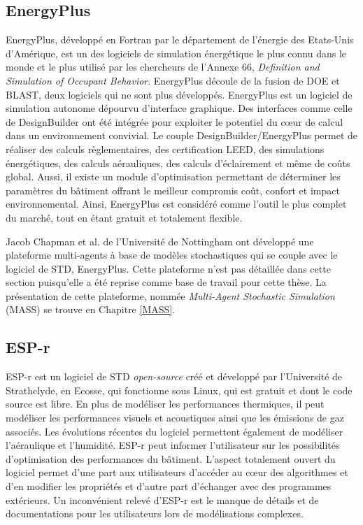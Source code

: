 \subsection*{EnergyPlus}

EnergyPlus, développé en Fortran par le département de l'énergie des Etats-Unis d'Amérique, est un des logiciels de simulation énergétique le plus connu dans le monde \cite{Sousa-13} et le plus utilisé par les chercheurs de l'Annexe 66, \textit{Definition and Simulation of Occupant Behavior}. EnergyPlus découle de la fusion de DOE et BLAST, deux logiciels qui ne sont plus développés. EnergyPlus est un logiciel de simulation autonome dépourvu d'interface graphique. Des interfaces comme celle de DesignBuilder ont été intégrée pour exploiter le potentiel du cœur de calcul dans un environnement convivial. Le couple DesignBuilder/EnergyPlus permet de réaliser des calculs règlementaires, des certification LEED, des simulations énergétiques, des calculs aérauliques, des calculs d'éclairement et même de coûts global. Aussi, il existe un module d'optimisation permettant de déterminer les paramètres du bâtiment offrant le meilleur compromis coût, confort et impact environnemental. Ainsi, EnergyPlus est considéré comme l'outil le plus complet du marché, tout en étant gratuit et totalement flexible.

Jacob Chapman et al. \cite{Chapman-14} de l'Université de Nottingham ont développé une plateforme multi-agents à base de modèles stochastiques qui se couple avec le logiciel de STD, EnergyPlus. Cette plateforme n'est pas détaillée dans cette section puisqu'elle a été reprise comme base de travail pour cette thèse. La présentation de cette plateforme, nommée \textit{Multi-Agent Stochastic Simulation} (MASS) se trouve en Chapitre \ref{MASS}.

\subsection*{ESP-r}

ESP-r est un logiciel de STD \textit{open-source} créé et développé par l'Université de Strathclyde, en Ecosse, qui fonctionne sous Linux, qui est gratuit et dont le code source est libre. En plus de modéliser les performances thermiques, il peut modéliser les performances visuels et acoustiques ainsi que les émissions de gaz associés. Les évolutions récentes du logiciel permettent également de modéliser l'aéraulique et l'humidité. ESP-r peut informer l'utilisateur sur les possibilités d'optimisation des performances du bâtiment. L'aspect totalement ouvert du logiciel permet d'une part aux utilisateurs d'accéder au cœur des algorithmes et d'en modifier les propriétés et d'autre part d'échanger avec des programmes extérieurs. Un inconvénient relevé d'ESP-r est le manque de détails et de documentations pour les utilisateurs lors de modélisations complexes.

